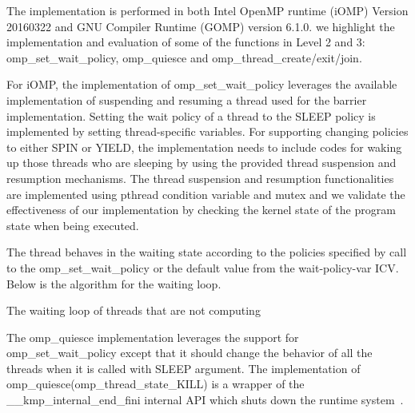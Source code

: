 The implementation is performed in both Intel OpenMP runtime (iOMP) Version 20160322 and GNU Compiler Runtime (GOMP) version 6.1.0. 
we highlight the implementation and evaluation of some of the functions in Level 2 and 3: 
{\sf omp\_set\_wait\_policy}, {\sf omp\_quiesce} and {\sf omp\_thread\_create/exit/join}. 

For iOMP, the implementation of {\sf omp\_set\_wait\_policy} leverages the available 
implementation of suspending and resuming a thread used for the barrier implementation. Setting the 
wait policy of a thread to the {\sf SLEEP} policy is implemented by setting thread-specific variables. For
supporting changing policies to either {\sf SPIN} or {\sf YIELD}, the implementation needs to include codes for 
waking up those threads who are sleeping by using the provided thread suspension and resumption mechanisms.  
The thread suspension and resumption functionalities are implemented using pthread condition variable and mutex and 
we validate the effectiveness of our implementation by checking the kernel state of the program state when being 
executed.

The thread behaves in the waiting state according to the policies specified by call to the {\sf omp\_set\_wait\_policy} or the default value from the wait-policy-var ICV. Below is the algorithm for the waiting loop.
\begin{algorithm}[ht]
	\small
    \caption{The waiting loop of threads that are not computing}

 \label{algo:worker_sched}
\end{algorithm} 


The {\sf omp\_quiesce} implementation leverages the support for {\sf omp\_set\_wait\_policy} except that it 
should change the behavior of all the threads when it is called with SLEEP argument. 
The implementation of {\sf omp\_quiesce(omp\_thread\_state\_KILL)} is a wrapper of 
the {\sf \_\_kmp\_internal\_end\_fini} internal API which shuts down the runtime system~\cite{iccmanual}. 


